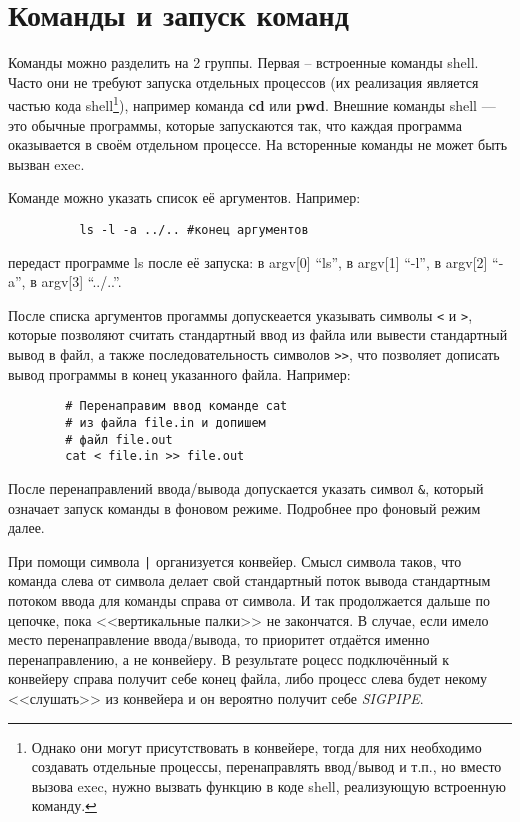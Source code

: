 \documentclass[11pt, a4paper]{article}
\begin{document}
\section{Команды и запуск команд}

Команды можно разделить на 2 группы. Первая -- встроенные команды shell. Часто они не требуют запуска
отдельных процессов (их реализация является частью кода shell\footnote{Однако они могут присутствовать 
в конвейере, тогда для них необходимо создавать отдельные процессы, перенаправлять ввод/вывод и т.п., 
но вместо вызова exec, нужно вызвать функцию в коде shell, реализующую встроенную команду.}),
например команда \textbf{cd} или \textbf{pwd}. Внешние команды shell --- это обычные
программы, которые запускаются так, что каждая программа оказывается в своём отдельном процессе.
На всторенные команды не может быть вызван exec.

Команде можно указать список её аргументов. Например:
{\small 
\begin{verbatim}
          ls -l -a ../.. #конец аргументов
\end{verbatim}
}
передаст программе ls после её запуска:
\newline в argv[0] ``ls'',
\newline в argv[1] ``-l'',
\newline в argv[2] ``-a'',
\newline в argv[3] ``../..''.

После списка аргументов прогаммы допускеается указывать символы \verb#<# и \verb#>#, которые позволяют 
считать стандартный ввод из файла или вывести стандартный вывод в файл, а также последовательность
символов \verb#>>#, что позволяет дописать вывод программы в конец указанного файла. 
Например:\newline
{\small
\begin{verbatim}
        # Перенаправим ввод команде cat 
        # из файла file.in и допишем 
        # файл file.out
        cat < file.in >> file.out
\end{verbatim}
}

После перенаправлений ввода/вывода допускается указать символ \verb#&#, который означает запуск 
команды в фоновом режиме. Подробнее про фоновый режим далее.

При помощи символа \verb#|# организуется конвейер. Смысл символа таков, что команда слева от символа
делает свой стандартный поток вывода стандартным потоком ввода для команды справа от символа. 
И так продолжается дальше по цепочке, пока <<вертикальные палки>> не закончатся. В случае, если имело 
место перенаправление ввода/вывода, то приоритет отдаётся именно перенаправлению, а не конвейеру. В
результате роцесс подключённый к конвейеру справа получит себе конец файла, либо процесс слева 
будет некому <<слушать>> из конвейера и он вероятно получит себе \textit{SIGPIPE}.
\end{document}
